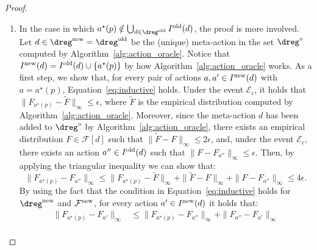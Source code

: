 \begin{proof}
\begin{enumerate}
\begin{enumerate}
			
			\item
			In the case in which $a^\star(p) \notin \bigcup_{d \in \dreg^{\textnormal{old}}} I^{\textnormal{old}}(d)$, the proof is more involved. 
			Let $d \in \dreg^{\textnormal{new}} =  \dreg^{\textnormal{old}}$ be the (unique) meta-action in the set $\dreg^\diamond$ computed by Algorithm~\ref{alg:action_oracle}.
			Notice that $I^{\textnormal{new}}(d) = I^{\textnormal{old}}(d) \cup \{a^\star(p)\}$ by how Algorithm~\ref{alg:action_oracle} works.
			As a first step, we show that, for every pair of actions $a,a' \in I^{\textnormal{new}}(d)$ with $a = a^\star(p)$, Equation~\eqref{eq:inductive} holds.
			Under the event $\mathcal{E}_\epsilon$, it holds that $\| F_{a^\star(p) }- \widetilde{F} \|_{\infty} \le \epsilon$, where $\widetilde{F}$ is the empirical distribution computed by Algorithm~\ref{alg:action_oracle}.
			Moreover, since the meta-action $d$ has been added to $\dreg^\diamond$ by Algorithm~\ref{alg:action_oracle}, there exists an empirical distribution $F \in \mathcal{F}[d]$ such that $\| \widetilde{F} - {F} \|_{\infty} \le 2\epsilon$, and, under the event $\mathcal{E}_\epsilon$, there exists an action $a'' \in I^\textnormal{old}(d)$ such that $\| F - F_{a''} \|_{\infty} \le \epsilon$.
			Then, by applying the triangular inequality we can show that:
			\begin{equation*}
				\| F_{a^\star(p) }- F_{a''}\|_{\infty} \le \| F_{a^\star(p) }- \widetilde{F} \|_{\infty}  + \|  \widetilde{F} - F\|_{\infty} + \| F - F_{a''}  \|_{\infty} \le 4 \epsilon.
			\end{equation*}
			By using the fact that the condition in Equation~\eqref{eq:inductive} holds for $\dreg^{\textnormal{new}}$ and $\mathcal{F}^{\textnormal{new}}$, for every action $a' \in I^{\textnormal{new}}(d)$ it holds that:
			\begin{align*}
				\| F_{a^\star(p)}- F_{ a'} \|_{\infty} & \le \| F_{a^\star(p)} - F_{a''}\|_{\infty} + \| F_{a''}- F_{a'}  \|_{\infty} \\

\end{align*}
\end{enumerate}
\end{enumerate}
\end{proof}
